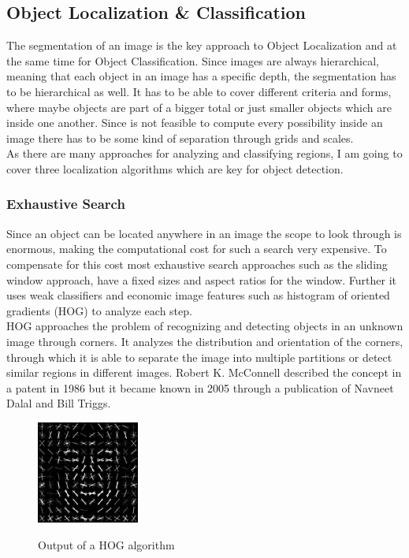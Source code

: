 \subsection{Object Localization \& Classification}
The segmentation of an image is the key approach to Object Localization and at the same time for Object Classification. Since images are
always hierarchical, meaning that each object in an image has a specific depth, the segmentation has to be hierarchical as well. It has to be able to cover different criteria and forms, where maybe
objects are part of a bigger total or just  smaller
objects which are inside one another. Since is not feasible to compute every possibility inside an image there has to be some kind of
separation through grids and scales. \\
As there are many approaches for analyzing and classifying regions, I am going to cover three localization algorithms which
are key for object detection.

\subsubsection{Exhaustive Search}
Since an object can be located anywhere in an image the scope to look through is enormous, making the computational cost for such a search very
expensive. To compensate for this cost most exhaustive search approaches such as the sliding window approach, have a fixed sizes and aspect
ratios for the window. Further it uses weak classifiers and economic image features such as histogram of oriented gradients
(HOG) to analyze each step.\cite{selectivesearch} \\ 
HOG approaches the problem of recognizing and detecting objects in an unknown image through corners. It analyzes the distribution and 
orientation of the corners, through which it is able to separate the image into multiple partitions or detect similar regions in different images.
Robert K. McConnell described the concept in a patent in 1986 but it became known in 2005 through a publication of Navneet Dalal and Bill
Triggs.\cite{hog}
\begin{figure}[!hbt]
    \caption{Output of a HOG algorithm}
    \begin{center}
        \includegraphics[width=0.3\textwidth]{images/object_detection/Dlib_Learned-HOG-Detector.jpg} \cite{hog}
    \end{center}
\end{figure}
